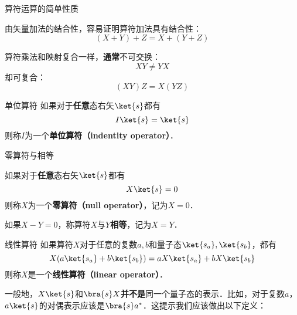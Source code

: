 \begin{theorem}{算符运算的简单性质}\label{QMPrcp_the4}

由矢量加法的结合性，容易证明算符加法具有结合性：
\begin{equation}
(X+Y)+Z=X+(Y+Z)
\end{equation}

算符乘法和映射复合一样，\textbf{通常}不可交换：
\begin{equation}\label{QMPrcp_eq6}
XY\neq YX
\end{equation}
却可复合：
\begin{equation}
(XY)Z=X(YZ)
\end{equation}


\end{theorem}

\begin{definition}{单位算符}\label{QMPrcp_def9}
如果对于\textbf{任意}态右矢$\ket{s}$都有
\begin{equation}
I\ket{s} = \ket{s}
\end{equation}
则称$I$为一个\textbf{单位算符（indentity operator）}．
\end{definition}



\begin{definition}{零算符与相等}\label{QMPrcp_def10}

如果对于\textbf{任意}态右矢$\ket{s}$都有
\begin{equation}
X\ket{s} = 0
\end{equation}
则称$X$为一个\textbf{零算符（null operator）}，记为$X=0$．

如果$X-Y=0$，称算符$X$与$Y$\textbf{相等}，记为$X=Y$．

\end{definition}







\begin{definition}{线性算符}\label{QMPrcp_def11}
如果算符$X$对于任意的复数$a, b$和量子态$\ket{s_a}, \ket{s_b}$，都有
\begin{equation}
X(a\ket{s_a}+b\ket{s_b}) = aX\ket{s_a}+bX\ket{s_b}
\end{equation}
则称$X$是一个\textbf{线性算符（linear operator）}．
\end{definition}


一般地，$X\ket{s}$和$\bra{s}X$\textbf{并不是}同一个量子态的表示．比如，对于复数$a$，$a\ket{s}$的对偶表示应该是$\bra{s}a^*$．这提示我们应该做出以下定义：

